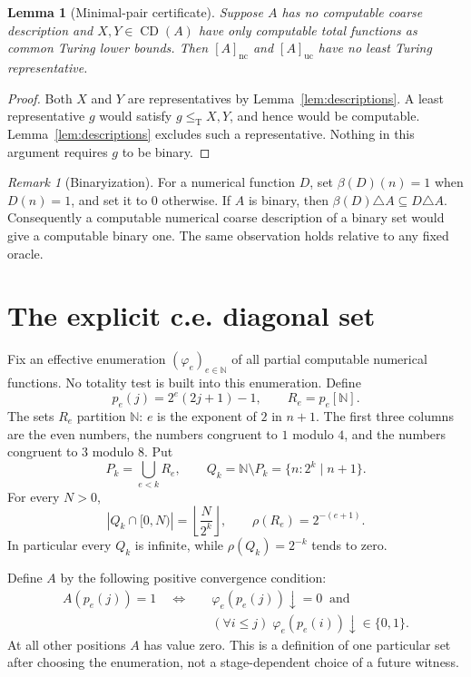 \documentclass[11pt,a4paper]{article}
\newcommand{\N}{\mathbb N}
\newcommand{\leT}{\leq_{\mathrm T}}
\newcommand{\CD}{\operatorname{CD}}
\newcommand{\nc}{\mathrm{nc}}
\newcommand{\uc}{\mathrm{uc}}
\newtheorem{lemma}[theorem]{Lemma}
\theoremstyle{definition}
\theoremstyle{remark}
\newtheorem{remark}[theorem]{Remark}
\begin{document}
\begin{lemma}[Minimal-pair certificate]\label{lem:certificate}
Suppose $A$ has no computable coarse description and $X,Y\in\CD(A)$
have only computable total functions as common Turing lower bounds.
Then $[A]_{\nc}$ and $[A]_{\uc}$ have no least Turing representative.
\end{lemma}
\begin{proof}
Both $X$ and $Y$ are representatives by Lemma~\ref{lem:descriptions}.
A least representative $g$ would satisfy $g\leT X,Y$, and hence would be
computable. Lemma~\ref{lem:descriptions} excludes such a representative.
Nothing in this argument requires $g$ to be binary.
\end{proof}

\begin{remark}[Binaryization]
For a numerical function $D$, set $\beta(D)(n)=1$ when $D(n)=1$, and set
it to $0$ otherwise. If $A$ is binary, then
$\beta(D)\triangle A\subseteq D\triangle A$.
Consequently a computable numerical coarse description of a binary set
would give a computable binary one. The same observation holds relative to
any fixed oracle.
\end{remark}

\section{The explicit c.e. diagonal set}\label{sec:columns}
Fix an effective enumeration $(\varphi_e)_{e\in\N}$ of all partial
computable numerical functions. No totality test is built into this
enumeration. Define
\begin{equation}\label{eq:columns}
 p_e(j)=2^e(2j+1)-1,\qquad R_e=p_e[\N].
\end{equation}
The sets $R_e$ partition $\N$: $e$ is the exponent of $2$ in $n+1$.
The first three columns are the even numbers, the numbers congruent to
$1$ modulo $4$, and the numbers congruent to $3$ modulo $8$.
Put
\begin{equation}\label{eq:protected}
 P_k=\bigcup_{e<k}R_e,\qquad Q_k=\N\setminus P_k
       =\{n:2^k\mid n+1\}.
\end{equation}
For every $N>0$,
\begin{equation}\label{eq:tailcount}
 |Q_k\cap[0,N)|=\left\lfloor\frac{N}{2^k}\right\rfloor,
 \qquad \rho(R_e)=2^{-(e+1)}.
\end{equation}
In particular every $Q_k$ is infinite, while $\rho(Q_k)=2^{-k}$ tends to zero.

Define $A$ by the following positive convergence condition:
\begin{equation}\label{eq:A}
\begin{split}
 A(p_e(j))=1\quad\Longleftrightarrow\quad &
 \varphi_e(p_e(j))\downarrow=0\ \text{ and }\\[-2pt]
 & (\forall i\le j)\;
       \varphi_e(p_e(i))\downarrow\in\{0,1\}.
\end{split}
\end{equation}
At all other positions $A$ has value zero. This is a definition of one
particular set after choosing the enumeration, not a stage-dependent
choice of a future witness.
\end{document}

